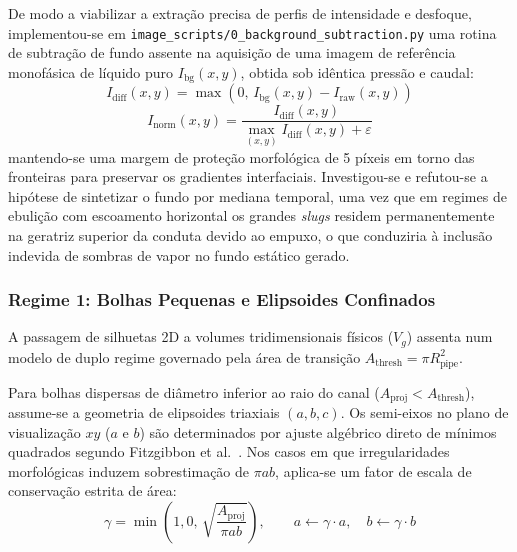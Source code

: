 De modo a viabilizar a extração precisa de perfis de intensidade e desfoque, implementou-se em \nolinkurl{image_scripts/0_background_subtraction.py} uma rotina de subtração de fundo assente na aquisição de uma imagem de referência monofásica de líquido puro $I_{\text{bg}}(x, y)$, obtida sob idêntica pressão e caudal:
\begin{equation}
    I_{\text{diff}}(x, y) = \max\left(0, \, I_{\text{bg}}(x, y) - I_{\text{raw}}(x, y)\right)
\end{equation}
\begin{equation}
    I_{\text{norm}}(x, y) = \frac{I_{\text{diff}}(x, y)}{\max_{(x,y)} I_{\text{diff}}(x, y) + \varepsilon}
\end{equation}
mantendo-se uma margem de proteção morfológica de 5 píxeis em torno das fronteiras para preservar os gradientes interfaciais. Investigou-se e refutou-se a hipótese de sintetizar o fundo por mediana temporal, uma vez que em regimes de ebulição com escoamento horizontal os grandes \emph{slugs} residem permanentemente na geratriz superior da conduta devido ao empuxo, o que conduziria à inclusão indevida de sombras de vapor no fundo estático gerado.

\subsubsection{Regime 1: Bolhas Pequenas e Elipsoides Confinados}
\label{subsubsec:regime1_bolhas}

A passagem de silhuetas 2D a volumes tridimensionais físicos ($V_g$) assenta num modelo de duplo regime governado pela área de transição $A_{\text{thresh}} = \pi R_{\text{pipe}}^2$.

Para bolhas dispersas de diâmetro inferior ao raio do canal ($A_{\text{proj}} < A_{\text{thresh}}$), assume-se a geometria de elipsoides triaxiais $(a, b, c)$. Os semi-eixos no plano de visualização $xy$ ($a$ e $b$) são determinados por ajuste algébrico direto de mínimos quadrados segundo Fitzgibbon et al.~\cite{fitzgibbon1999direct}. Nos casos em que irregularidades morfológicas induzem sobrestimação de $\pi a b$, aplica-se um fator de escala de conservação estrita de área:
\begin{equation}
    \gamma = \min\left(1{,}0, \, \sqrt{\frac{A_{\text{proj}}}{\pi a b}}\right), \qquad a \leftarrow \gamma \cdot a, \quad b \leftarrow \gamma \cdot b
\end{equation}


